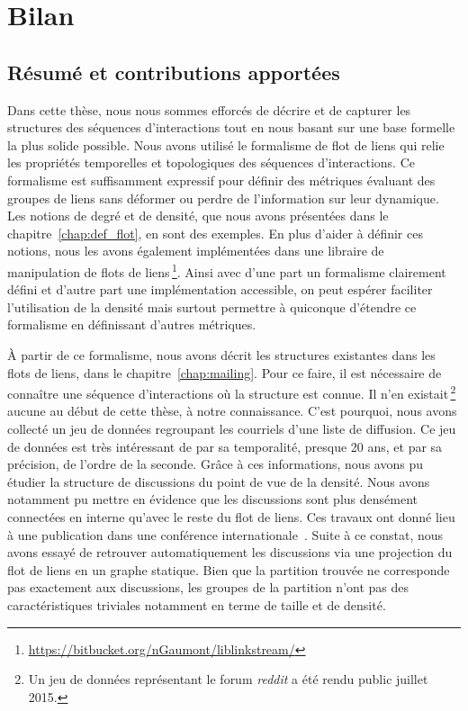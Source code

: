 \chapter{Bilan}
\label{Conclusion}

\section{Résumé et contributions apportées}

Dans cette thèse, nous nous sommes efforcés de décrire et de capturer les structures des séquences d'interactions tout en nous basant sur une base formelle la plus solide possible.
Nous avons utilisé le formalisme de flot de liens qui relie les propriétés temporelles et topologiques des séquences d'interactions.
Ce formalisme est suffisamment expressif pour définir des métriques évaluant des groupes de liens sans déformer ou perdre de l'information sur leur dynamique.
Les notions de degré et de densité, que nous avons présentées dans le chapitre~\ref{chap:def_flot}, en sont des exemples.
En plus d'aider à définir ces notions, nous les avons également implémentées dans une libraire de manipulation de flots de liens\,\footnote{\url{https://bitbucket.org/nGaumont/liblinkstream/}}.
Ainsi avec d'une part un formalisme clairement défini et d'autre part une implémentation accessible, on peut espérer faciliter l'utilisation de la densité mais surtout permettre à quiconque d'étendre ce formalisme en définissant d'autres métriques.

\`A partir de ce formalisme, nous avons décrit les structures existantes dans les flots de liens, dans le chapitre~\ref{chap:mailing}.
Pour ce faire, il est nécessaire de connaître une séquence d'interactions où la structure est connue.
Il n'en existait\,\footnote{Un jeu de données représentant le forum \emph{reddit} a été rendu public juillet 2015.} aucune au début de cette thèse, à notre connaissance.
C'est pourquoi, nous avons collecté un jeu de données regroupant les courriels d'une liste de diffusion.
Ce jeu de données est très intéressant de par sa temporalité, presque 20 ans, et par sa précision, de l'ordre de la seconde.
Grâce à ces informations, nous avons pu étudier la structure de discussions du point de vue de la densité.
Nous avons notamment pu mettre en évidence que les discussions sont plus densément connectées en interne qu'avec le reste du flot de liens.
Ces travaux ont donné lieu à une publication dans une conférence internationale~\cite{Gaumont2016}.
Suite à ce constat, nous avons essayé de retrouver automatiquement les discussions via une projection du flot de liens en un graphe statique.
Bien que la partition trouvée ne corresponde pas exactement aux discussions, les groupes de la partition n'ont pas des caractéristiques triviales notamment en terme de taille et de densité.


